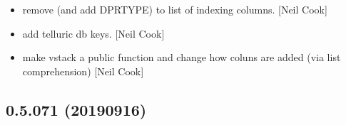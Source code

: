 \documentclass[a4paper,10pt,english]{report}
\begin{document}
\begin{itemize}
\item {} 
 \sphinxhyphen{} remove  (and add
DPRTYPE) to list of indexing columns. {[}Neil Cook{]}

\item {} 
 \sphinxhyphen{} add telluric db keys. {[}Neil Cook{]}

\item {} 
 \sphinxhyphen{} make vstack a public function and change how
coluns are added (via list comprehension) {[}Neil Cook{]}

\end{itemize}


\subsection{0.5.071 (2019\sphinxhyphen{}09\sphinxhyphen{}16)}
\end{document}
